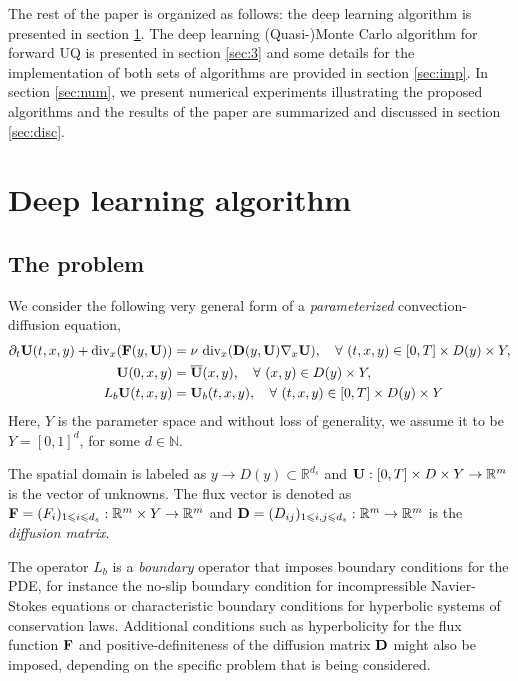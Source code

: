 \documentclass[a4paper]{article}
\numberwithin{equation}{section}
\numberwithin{equation}{section}
\theoremstyle{definition}
\theoremstyle{myremarkstyle}
\renewcommand{\leq}{\leqslant}
\newcommand{\R}{\mathbb{R}}
\newcommand{\U}{{\bf U}}		%
\newcommand{\F}{{\bf F}}
\begin{document}
The rest of the paper is organized as follows: the deep learning algorithm is presented in section \ref{sec:2}. The deep learning (Quasi-)Monte Carlo algorithm for forward UQ is presented in section \ref{sec:3} and some details for the implementation of both sets of algorithms are provided in section \ref{sec:imp}. In section \ref{sec:num}, we present numerical experiments illustrating the proposed algorithms and the results of the paper are summarized and discussed in section \ref{sec:disc}.
\section{Deep learning algorithm}
\label{sec:2}
\subsection{The problem}
\label{sec:2.1}
We consider the following very general form of a \emph{parameterized} convection-diffusion equation,
\begin{equation}
\label{eq:cdep}
\begin{aligned}
\partial_t \U(t,x,y) + {\rm div}_x (\F(y, \U)) &= \nu ~{\rm div}_x({\bf D}(y,\U) \nabla_x \U), \quad \forall~(t,x,y) \in [0,T] \times D(y) \times Y, \\
\U(0,x,y) &= \overline{\U}(x,y), \quad \forall~ (x,y) \in D(y) \times Y, \\
L_{b} \U(t,x,y) &= \U_b (t,x,y), \quad \forall ~(t,x,y) \in [0,T] \times D(y) \times Y
\end{aligned}
\end{equation}
Here, $Y$ is the parameter space and without loss of generality, we assume it to be $Y = [0,1]^{d}$, for some $d \in {\mathbb N}$.  

The spatial domain is labeled as $y \rightarrow D(y) \subset \R^{d_s}$ and  $\U: [0,T] \times D \times Y  \rightarrow \R^m$ is the vector of unknowns. The flux vector is denoted as $\F = (F_i)_{1\leq i \leq d_s}:\R^m \times Y \rightarrow \R^m$ and ${\bf D} = (D_{ij})_{1\leq i,j \leq d_s}: \R^m \rightarrow \R^m$ is the \emph{diffusion matrix}. 

The operator $L_b$ is a \emph{boundary} operator that imposes boundary conditions for the PDE, for instance the no-slip boundary condition for incompressible Navier-Stokes equations or characteristic boundary conditions for hyperbolic systems of conservation laws. Additional conditions such as hyperbolicity for the flux function $\F$ and positive-definiteness of the diffusion matrix ${\bf D}$ might also be imposed, depending on the specific problem that is being considered. 
\end{document}
